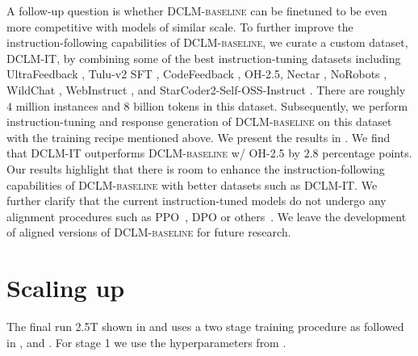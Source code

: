 \documentclass{article}
\newcommand{\hqpool}{\textsc{DCLM-baseline}\xspace}
\newcommand{\itpool}{\textsc{DCLM-IT}\xspace}
\newcommand{\oh}{\textsc{OH-2.5}\xspace}
\begin{document}
A follow-up question is whether \hqpool can be finetuned to be even more competitive with models of similar scale. To further improve the instruction-following capabilities of \hqpool, we curate a custom dataset, \itpool, by combining some of the best instruction-tuning datasets including UltraFeedback \citep{cui2023ultrafeedback}, Tulu-v2 SFT \citep{ivison2023camels}, CodeFeedback \citep{zheng2024opencodeinterpreter}, \oh, Nectar \citep{starling2023}, NoRobots \citep{no_robots}, WildChat \citep{zhao2024wildchat}, WebInstruct \citep{yue2024mammoth2}, and StarCoder2-Self-OSS-Instruct \citep{starcoder2instruct}. There are roughly $4$ million instances and $8$ billion tokens in this dataset. Subsequently, we perform instruction-tuning and response generation of \hqpool on this dataset with the training recipe mentioned above. We present the results in . We find that \itpool outperforms \hqpool w/ \oh by $2.8$ percentage points. Our results highlight that there is room to enhance the instruction-following capabilities of \hqpool with better datasets such as \itpool. We further clarify that the current instruction-tuned models do not undergo any alignment procedures such as PPO~\citep{schulman2017proximal}, DPO \citep{rafailov2024direct} or others~\citep{ethayarajh2024kto,calandriello2024human,bansal2024comparing,meng2024simpo}. We leave the development of aligned versions of \hqpool for future research.

\section{Scaling up}\label{appx:hero-run}
The final run 2.5T shown in  and  uses a two stage training procedure as followed in \citet{groeneveld2024olmo}, \citet{hu2024minicpm} and \citet{gemmateam2024gemma}. For stage 1 we use the hyperparameters from .
\end{document}
